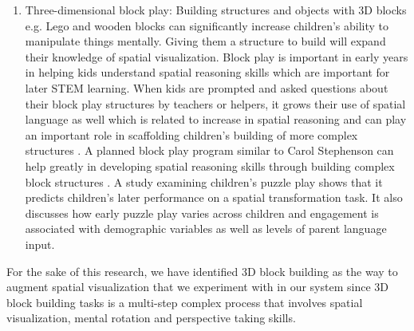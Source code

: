 \begin{enumerate}
    \item Three-dimensional block play: Building structures and objects with 3D blocks e.g. Lego\textsuperscript\textregistered{} \parencite{wolfgang2003advanced} and wooden blocks can significantly increase children's ability to manipulate things mentally. Giving them a structure to build will expand their knowledge of spatial visualization. Block play is important in early years in helping kids understand spatial reasoning skills which are important for later STEM learning. When kids are prompted and asked questions about their block play structures by teachers or helpers, it grows their use of spatial language as well which is related to increase in spatial reasoning \parencite{pruden2011children} and can play an important role in scaffolding children’s building of more complex structures \parencite{kersh2008research}. A planned block play program similar to Carol Stephenson can help greatly in developing spatial reasoning skills through building complex block structures \parencite{tepylo2015developmental}. A study examining children's puzzle play \parencite{levine2012early} shows that it predicts children's later performance on a spatial transformation task. It also discusses how early puzzle play varies across children and engagement is associated with demographic variables as well as levels of parent language input.
\end{enumerate}
For the sake of this research, we have identified 3D block building as the way to augment spatial visualization that we experiment with in our system since 3D block building tasks is a multi-step complex process that involves spatial visualization, mental rotation and perspective taking skills.


